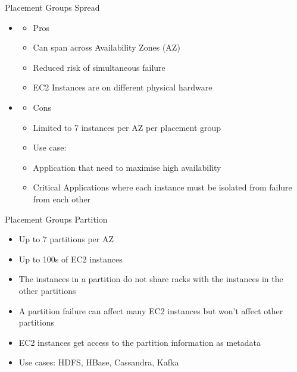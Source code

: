 Placement Groups Spread
\begin{itemize}
    \item
    \begin{itemize}
        \item Pros
        \item Can span across Availability Zones (AZ)
        \item Reduced risk of simultaneous failure
        \item EC2 Instances are on different physical hardware
    \end{itemize}
    \item
    \begin{itemize}
        \item Cons
        \item Limited to 7 instances per AZ per placement group
        \item Use case:
        \item Application that need to maximise high availability
        \item Critical Applications where each instance must be isolated from failure from each other
    \end{itemize}
\end{itemize}

Placement Groups Partition
\begin{itemize}
    \item Up to 7 partitions per AZ
    \item Up to 100s of EC2 instances
    \item The instances in a partition do not share racks with the instances in the other partitions
    \item A partition failure can affect many EC2 instances but won't affect other partitions
    \item EC2 instances get access to the partition information as metadata
    \item Use cases: HDFS, HBase, Cassandra, Kafka
\end{itemize}

